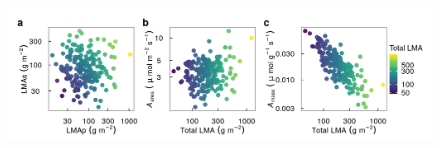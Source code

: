 \documentclass[
  12pt,
  a4paper,
,tablecaptionabove
]{scrartcl}
\providecommand{\DIFaddbeginFL}{} %
\providecommand{\DIFdelbeginFL}{} %
\providecommand{\DIFdelendFL}{} %
\newcommand{\DIFscaledelfig}{0.5}
\newlength{\DIFdelgraphicswidth} %
\newlength{\DIFdelgraphicsheight} %
\newcommand{\DIFaddincludegraphics}[2][]{{\color{blue}\fbox{\DIFOincludegraphics[#1]{#2}}}} %
\newcommand{\DIFdelincludegraphics}[2][]{%
\sbox{\DIFdelgraphicsbox}{\DIFOincludegraphics[#1]{#2}}%
\settoboxwidth{\DIFdelgraphicswidth}{\DIFdelgraphicsbox} %
\settoboxtotalheight{\DIFdelgraphicsheight}{\DIFdelgraphicsbox} %
\scalebox{\DIFscaledelfig}{%
\parbox[b]{\DIFdelgraphicswidth}{\usebox{\DIFdelgraphicsbox}\\[-\baselineskip] \rule{\DIFdelgraphicswidth}{0em}}\llap{\resizebox{\DIFdelgraphicswidth}{\DIFdelgraphicsheight}{%
\setlength{\unitlength}{\DIFdelgraphicswidth}%
\begin{picture}(1,1)%
\thicklines\linethickness{2pt} %
{\color[rgb]{1,0,0}\put(0,0){\framebox(1,1){}}}%
{\color[rgb]{1,0,0}\put(0,0){\line( 1,1){1}}}%
{\color[rgb]{1,0,0}\put(0,1){\line(1,-1){1}}}%
\end{picture}%
}\hspace*{3pt}}} %
} %
\DeclareRobustCommand{\DIFaddbeginFL}{\DIFOaddbeginFL \let\includegraphics\DIFaddincludegraphics} %
\DeclareRobustCommand{\DIFdelbeginFL}{\DIFOdelbeginFL \let\includegraphics\DIFdelincludegraphics} %
\DeclareRobustCommand{\DIFdelendFL}{\DIFOaddendFL \let\includegraphics\DIFOincludegraphics} %
\begin{document}
\begin{figure}
\DIFdelbeginFL %
\DIFdelendFL \DIFaddbeginFL

{\centering \includegraphics{../figs/hypo.png}

}


\end{figure}
\end{document}
